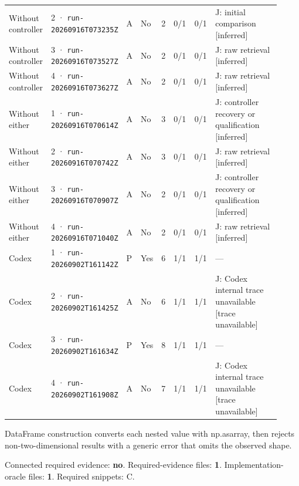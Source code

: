 \begin{landscape}
\begin{longtable}{@{}L{0.11\linewidth}L{0.16\linewidth}*{1}{L{0.022\linewidth}}L{0.05\linewidth}L{0.045\linewidth}L{0.08\linewidth}L{0.085\linewidth}L{0.368\linewidth}@{}}
Without controller & 2 · \texttt{run-20260916\allowbreak T073235Z} & A & No & 2 & 0/1 & 0/1 & J: initial comparison [inferred] \\
Without controller & 3 · \texttt{run-20260916\allowbreak T073527Z} & A & No & 2 & 0/1 & 0/1 & J: raw retrieval [inferred] \\
Without controller & 4 · \texttt{run-20260916\allowbreak T073627Z} & A & No & 2 & 0/1 & 0/1 & J: raw retrieval [inferred] \\
Without either & 1 · \texttt{run-20260916\allowbreak T070614Z} & A & No & 3 & 0/1 & 0/1 & J: controller recovery or qualification [inferred] \\
Without either & 2 · \texttt{run-20260916\allowbreak T070742Z} & A & No & 3 & 0/1 & 0/1 & J: raw retrieval [inferred] \\
Without either & 3 · \texttt{run-20260916\allowbreak T070907Z} & A & No & 2 & 0/1 & 0/1 & J: controller recovery or qualification [inferred] \\
Without either & 4 · \texttt{run-20260916\allowbreak T071040Z} & A & No & 2 & 0/1 & 0/1 & J: raw retrieval [inferred] \\
Codex & 1 · \texttt{run-20260902\allowbreak T161142Z} & P & Yes & 6 & 1/1 & 1/1 & --- \\
Codex & 2 · \texttt{run-20260902\allowbreak T161425Z} & A & No & 6 & 1/1 & 1/1 & J: Codex internal trace unavailable [trace unavailable] \\
Codex & 3 · \texttt{run-20260902\allowbreak T161634Z} & P & Yes & 8 & 1/1 & 1/1 & --- \\
Codex & 4 · \texttt{run-20260902\allowbreak T161908Z} & A & No & 7 & 1/1 & 1/1 & J: Codex internal trace unavailable [trace unavailable] \\
\end{longtable}
\endgroup
\end{landscape}

\label{sec:pandas-dev-pandas-32289}

DataFrame construction converts each nested value with np.asarray, then rejects non-two-dimensional results with a generic error that omits the observed shape.

Connected required evidence: \textbf{no}. Required-evidence files: \textbf{1}. Implementation-oracle files: \textbf{1}. Required snippets: C.

